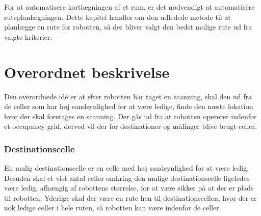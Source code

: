 \label{ruteplanleagning}
\newcommand{\unkcell}[3][]{\node (robot) [draw,fill=yellow, text centered, rectangle,
minimum height=\cellsize cm,minimum width=\cellsize cm, align=right] at ($(#2*\cellsize,#3*\cellsize) + (\cellsize/2,\cellsize/2)$) {$\scriptstyle #1$};}

\newcommand{\emptycell}[3][]{\node (robot) [draw,fill=green, text centered, rectangle,
minimum height=\cellsize cm,minimum width=\cellsize cm, align=right] at ($(#2*\cellsize,#3*\cellsize) + (\cellsize/2,\cellsize/2)$) {$\scriptstyle #1$};}

\newcommand{\occcell}[3][]{\node (robot) [draw,fill=red, text centered, rectangle,
minimum height=\cellsize cm,minimum width=\cellsize cm, align=right] at ($(#2*\cellsize,#3*\cellsize) + (\cellsize/2,\cellsize/2)$) {$\scriptstyle #1$};}

\newcommand{\scancell}[3][]{\node (robot) [draw,fill=orange, text centered, rectangle,
minimum height=\cellsize cm,minimum width=\cellsize cm, align=right] at ($(#2*\cellsize,#3*\cellsize) + (\cellsize/2,\cellsize/2)$) {$\scriptstyle #1$};}

\newcommand{\destcell}[3][]{\node (robot) [draw,fill=blue, text centered, rectangle,
minimum height=\cellsize cm,minimum width=\cellsize cm, align=right] at ($(#2*\cellsize,#3*\cellsize) + (\cellsize/2,\cellsize/2)$) {$\scriptstyle #1$};}

For at automatisere kortlægningen af et rum, er det nødvendigt at automatisere ruteplanlægningen.
Dette kapitel handler om den udledede metode til at planlægge en rute for robotten, så der bliver valgt den bedst mulige rute ud fra valgte kriterier.

\section{Overordnet beskrivelse}
Den overordnede idé er at efter robotten har taget en scanning, skal den ud fra de celler som har høj sandsynlighed for at være ledige, finde den næste lokation hvor der skal foretages en scanning.
Der gås ud fra at robotten opererer indenfor et occupancy grid, derved vil der for destinationer og målinger blive brugt celler.

\subsubsection{Destinationscelle}\label{rute:destinationscelle}
En mulig destinationscelle er en celle med høj sandsynlighed for at være ledig.
Desuden skal et vist antal celler omkring den mulige destinationscelle ligeledes være ledig, afhængig af robottens størrelse, for at være sikker på at der er plads til robotten.
Yderlige skal der være en rute hen til destinationscellen, hvor der er nok ledige celler i hele ruten, så robotten kan være indenfor de celler.

